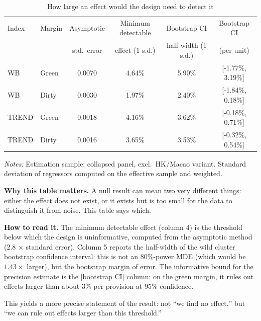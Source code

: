 \begin{table}[htbp]
\centering
\footnotesize
\caption{How large an effect would the design need to detect it}
\label{tab:mde}
\begin{threeparttable}
\begin{tabular}{llcccc}
\toprule
Index & Margin & Asymptotic & Minimum detectable & Bootstrap CI & Bootstrap CI \\
 & & std.\ error & effect (1 s.d.) & half-width (1 s.d.) & (per unit) \\
\midrule
WB & Green & 0.0070 & 4.64\% & 5.90\% & [-1.77\%, 3.19\%] \\
WB & Dirty & 0.0030 & 1.97\% & 2.40\% & [-1.84\%, 0.18\%] \\
TREND & Green & 0.0018 & 4.16\% & 3.62\% & [-0.18\%, 0.71\%] \\
TREND & Dirty & 0.0016 & 3.65\% & 3.53\% & [-0.32\%, 0.54\%] \\
\bottomrule
\end{tabular}
\begin{tablenotes}[flushleft]\footnotesize
\item \emph{Notes:} Estimation sample: collapsed panel, excl.\ HK/Macao variant. Standard deviation of regressors computed on the effective sample and weighted.
\item \textbf{Why this table matters.} A null result can mean two very different things: either the effect does not exist, or it exists but is too small for the data to distinguish it from noise. This table says which.
\item \textbf{How to read it.} The minimum detectable effect (column 4) is the threshold below which the design is uninformative, computed from the asymptotic method (2.8 $\times$ standard error). Column 5 reports the half-width of the wild cluster bootstrap confidence interval: this is not an 80\%-power MDE (which would be $1.43\times$ larger), but the bootstrap margin of error. The informative bound for the precision estimate is the [bootstrap CI] column: on the green margin, it rules out effects larger than about 3\% per provision at 95\% confidence.
\item This yields a more precise statement of the result: not ``we find no effect,'' but ``we can rule out effects larger than this threshold.''
\end{tablenotes}
\end{threeparttable}
\end{table}
